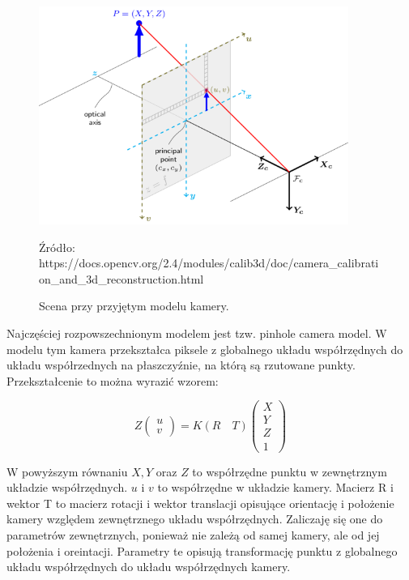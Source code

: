 \documentclass[oneside, eng]{mgr}
\begin{document}
\begin{figure}
\centering
	\includegraphics[width=0.90\textwidth]{pinhole_camera_model.png}\par\vspace{1cm}
\caption{Scena przy przyjętym modelu kamery.}
Źródło: https://docs.opencv.org/2.4/modules/calib3d/doc/camera\_calibration\_and\_3d\_reconstruction.html
	\label{fig:camera_model}
\end{figure}

Najczęściej rozpowszechnionym modelem jest tzw. pinhole camera model. W modelu tym kamera przekształca piksele z globalnego układu współrzędnych do układu współrzednych na płaszczyźnie, na którą są rzutowane punkty. Przekształcenie to można wyrazić wzorem:

\begin{equation}
	Z
	\left( \begin{array}{l}
		u \\
		v 
	\end{array} \right) 
	= K (R \quad T) 
	\left( \begin{array}{l}
		X \\	Y \\	Z \\	1
	\end{array} \right) 
\end{equation}

W powyższym równaniu $X, Y$ oraz $Z$ to współrzędne punktu w zewnętrznym układzie współrzędnych.
$u$ i $v$ to współrzędne w układzie kamery.
Macierz R i wektor T to macierz rotacji i wektor translacji opisujące orientację i położenie kamery względem zewnętrznego układu współrzędnych. Zaliczaję się one do parametrów zewnętrznych, ponieważ nie zależą od samej kamery, ale od jej położenia i oreintacji. Parametry te opisują transformację punktu z globalnego układu współrzędnych do układu współrzędnych kamery. 
\end{document}
